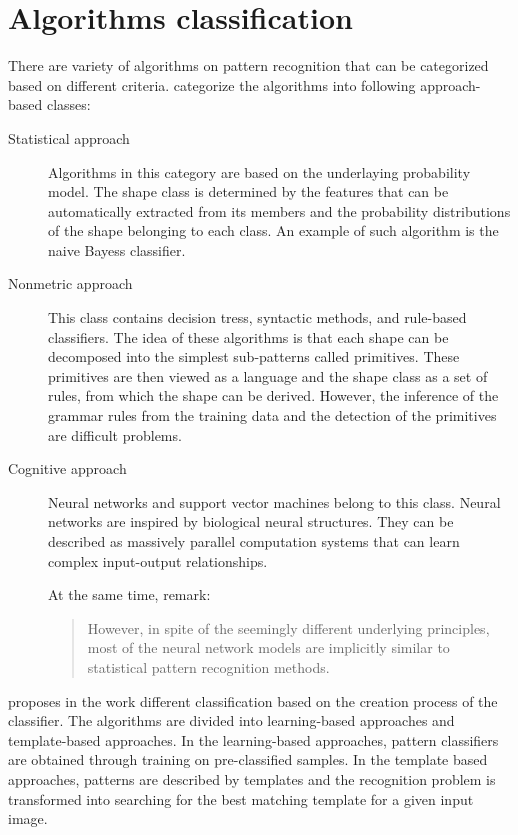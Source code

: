 \section{Algorithms classification}
There are variety of  algorithms on  pattern recognition that can be categorized based on different criteria. \citet{imageRecognition} categorize the algorithms into following approach-based classes:
\begin{description}
\item [Statistical approach] Algorithms in this category are based on the underlaying probability model. The shape class is determined by the features that can be automatically extracted from its members and the probability distributions of the shape belonging to each class. An example of such algorithm is the naive Bayess classifier.

\item [Nonmetric approach] This class contains decision tress, syntactic methods, and rule-based classifiers. The idea of these algorithms is that each shape can be decomposed into the simplest sub-patterns called primitives. These primitives are then viewed as a language and the shape class as a set of rules, from which the shape can be derived. However, the inference of the grammar rules from the training data and the detection of the primitives are difficult problems.

\item [Cognitive approach] Neural networks and support vector machines belong to this class. Neural networks are inspired by biological neural structures. They can be described as massively parallel computation systems that can learn complex input-output relationships.

At the same time, \cite{imageRecognition} remark:
\begin{quotation} However, in spite of the seemingly different underlying principles, most of the neural network models are implicitly similar to statistical pattern recognition methods. \end{quotation}

\end{description}

\cite{skeletonMatching} proposes in the work different classification based on the creation process of the classifier. The algorithms are divided into learning-based approaches and template-based approaches. In the learning-based approaches, pattern classifiers are obtained through training on pre-classified samples. In the template based approaches, patterns are described by templates and the recognition problem is transformed into searching for the best matching template for a given input image.


